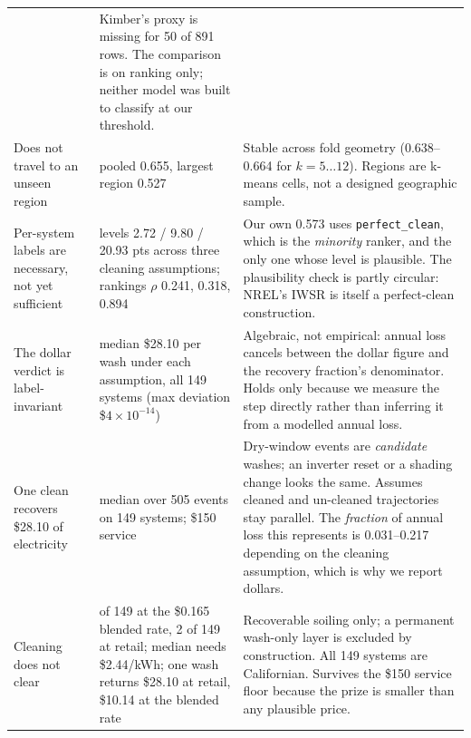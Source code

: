 \documentclass[10pt,twocolumn]{article}
\begin{document}
\begin{table}[t]
\begin{tabular}{p{4.6cm}>{\raggedright\arraybackslash}p{3.3cm}p{7.4cm}}
      & Kimber's proxy is missing for 50 of 891 rows. The comparison is on ranking only;
        neither model was built to classify at our threshold. \\
    \addlinespace
    Does not travel to an unseen region
      & pooled 0.655, largest region 0.527
      & Stable across fold geometry (0.638--0.664 for $k=5\ldots12$). Regions are k-means
        cells, not a designed geographic sample. \\
    \addlinespace
    Per-system labels are necessary, not yet sufficient
      & levels 2.72 / 9.80 / 20.93 pts across three cleaning assumptions; rankings
        $\rho$ 0.241, 0.318, 0.894
      & Our own 0.573 uses \texttt{perfect\_clean}, which is the \emph{minority} ranker,
        and the only one whose level is plausible. The plausibility check is partly
        circular: NREL's IWSR is itself a perfect-clean construction. \\
    \addlinespace
    The dollar verdict is label-invariant
      & median \$28.10 per wash under each assumption, all 149 systems (max deviation
        \$$4\times10^{-14}$)
      & Algebraic, not empirical: annual loss cancels between the dollar figure and the
        recovery fraction's denominator. Holds only because we measure the step directly
        rather than inferring it from a modelled annual loss. \\
    \addlinespace
    One clean recovers \$28.10 of electricity
      & median over 505 events on 149 systems; \$150 service
      & Dry-window events are \emph{candidate} washes; an inverter reset or a shading change
        looks the same. Assumes cleaned and un-cleaned trajectories stay parallel. The
        \emph{fraction} of annual loss this represents is 0.031--0.217 depending on the
        cleaning assumption, which is why we report dollars. \\
    \addlinespace
    Cleaning does not clear
      & 0 of 149 at the \$0.165 blended rate, 2 of 149 at retail; median needs \$2.44/kWh; one wash
        returns \$28.10 at retail, \$10.14 at the blended rate
      & Recoverable soiling only; a permanent wash-only layer is excluded by construction.
        All 149 systems are Californian. Survives the \$150 service floor because the prize
        is smaller than any plausible price. \\
    \bottomrule
  \end{tabular}
\end{table}

\label{sec:discussion}
\end{document}
